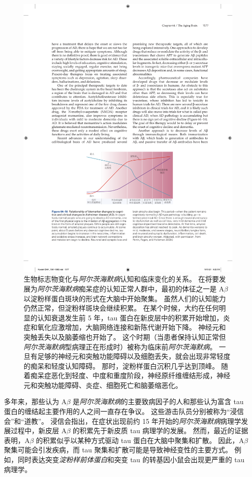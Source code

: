 \begin{figure}[htbp]
	\centering
	\includegraphics[width=0.85\linewidth]{chap64/fig_64_16}
	\caption{生物标志物变化与\textit{阿尔茨海默病}认知和临床变化的关系。
		在将要发展为\textit{阿尔茨海默病}痴呆症的认知正常人群中，最初的体征之一是 A$\beta$ 以淀粉样蛋白斑块的形式在大脑中开始聚集。
		虽然人们的认知能力仍然正常，但淀粉样斑块会继续积累。
		在某个时候，大约在任何明显的认知衰退发生前 5 年，tau 蛋白在新皮层中的积累开始增加，炎症和氧化应激增加，大脑网络连接和新陈代谢开始下降。
		神经元和突触丢失以及脑萎缩也开始了。
		这个时期（当患者保持认知正常但\textit{阿尔茨海默病}型病理正在形成时）被称为临床前\textit{阿尔茨海默病}。
		一旦有足够的神经元和突触功能障碍以及细胞丢失，就会出现非常轻度的痴呆和轻度认知障碍。
		那时，淀粉样蛋白沉积几乎达到顶峰。
		随着痴呆症恶化到轻度、中度和重度阶段，神经原纤维缠结形成，神经元和突触功能障碍、炎症、细胞死亡和脑萎缩恶化\cite{perrin2009multimodal}。}
	\label{fig:64_16}
\end{figure}


多年来，那些认为 A$\beta$ 是\textit{阿尔茨海默病}的主要致病因子的人和那些认为富含 tau 蛋白的缠结起主要作用的人之间一直存在争议。
这些游击队员分别被称为“浸信会”和“道教”。
浸信会指出，在症状出现前约 15 年开始的\textit{阿尔茨海默病}病理学发展过程中，新皮层 A$\beta$ 的积累先于新皮质 tau 病理学的发展。
然而，最近的证据表明，A$\beta$ 的积累似乎以某种方式驱动 tau 蛋白在大脑中聚集和扩散。
因此，A$\beta$ 聚集可能会引发疾病，而 tau 聚集和扩散可能是导致神经变性的主要方式。
例如，同时表达突变\textit{淀粉样前体蛋白}和突变 tau 的转基因小鼠会出现更严重的 tau 病理学。


